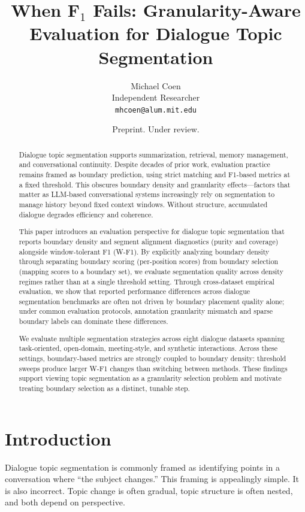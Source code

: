 \documentclass{article}
\title{When F$_1$ Fails: Granularity-Aware Evaluation for Dialogue Topic Segmentation}
\author{
Michael Coen\\
Independent Researcher\\
\texttt{mhcoen@alum.mit.edu}
}
\date{Preprint. Under review.}
\begin{document}
\maketitle


\begin{abstract}
Dialogue topic segmentation supports summarization, retrieval, memory
management, and conversational continuity. Despite decades of prior
work, evaluation practice remains framed as boundary prediction,
using strict matching and F1-based metrics at a fixed threshold. This
obscures boundary density and granularity effects—factors that matter
as LLM-based conversational systems increasingly rely on segmentation
to manage history beyond fixed context windows. Without structure,
accumulated dialogue degrades efficiency and coherence.

This paper introduces an evaluation perspective for dialogue topic
segmentation that reports boundary density and segment alignment
diagnostics (purity and coverage) alongside window-tolerant F1
(W-F1). By explicitly analyzing boundary density through separating
boundary scoring (per-position scores) from boundary selection
(mapping scores to a boundary set), we evaluate segmentation quality
across density regimes rather than at a single threshold
setting. Through cross-dataset empirical evaluation, we show that
reported performance differences across dialogue segmentation
benchmarks are often not driven by boundary placement quality alone;
under common evaluation protocols, annotation granularity mismatch and
sparse boundary labels can dominate these differences.

We evaluate multiple segmentation strategies across eight dialogue
datasets spanning task-oriented, open-domain, meeting-style, and
synthetic interactions. Across these settings, boundary-based metrics
are strongly coupled to boundary density: threshold sweeps produce
larger W-F1 changes than switching between methods. These findings
support viewing topic segmentation as a granularity selection problem
and motivate treating boundary selection as a distinct, tunable step.
\end{abstract}

\section{Introduction}
Dialogue topic segmentation is commonly framed as identifying points
in a conversation where ``the subject changes.'' This framing is
appealingly simple. It is also incorrect. Topic change is often
gradual, topic structure is often nested, and both depend on
perspective.
\end{document}
